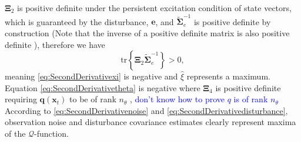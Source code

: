 \documentclass[]{article}
\newcommand{\blue}{\textcolor{blue}}
\begin{document}
$\boldsymbol\Xi_2$ is positive definite under the persistent excitation condition of state vectors, which is guaranteed by the disturbance, $\mathbf e$, and $\tilde{\boldsymbol\Sigma}_e^{-1}$ is positive definite by construction (Note that the inverse of a positive definite matrix is also positive definite \cite{Horn2005}), therefore we have \cite{Coope1994}
\begin{equation}
 \mathrm{tr}\left\lbrace \boldsymbol\Xi_2 \tilde{\boldsymbol\Sigma}_e^{-1}\right\rbrace >0,
\end{equation}
meaning \eqref{eq:SecondDerivativexi} is negative and $\hat{\xi}$ represents a maximum. Equation \eqref{eq:SecondDerivativetheta} is negative where $\boldsymbol\Xi_4$ is positive definite requiring $\mathbf q(\mathbf x_t)$ to be of  rank $n_{\theta}$ \cite{Golub1996}, 
\blue{don't know how to prove $q$ is of rank $n_{\theta}$} According to \eqref{eq:SecondDerivativenoise} and \eqref{eq:SecondDerivativedisturbance}, observation noise and disturbance covariance estimates clearly represent maxima of the $\mathcal{Q}$-function. 
 
\end{document}
